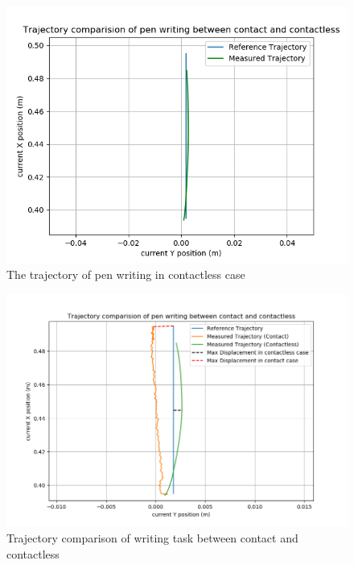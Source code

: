 \documentclass[report.tex]{subfiles}
\begin{document}
    \begin{figure}[H]
        \captionsetup[figure]{justification=centering}
                \centering
                \includegraphics[width=0.8\linewidth]{images/us2_contactless_traj.png}
                \caption{The trajectory of pen writing in contactless case}
                \label{fig:us2_nocon_plot}
    \end{figure}
    \begin{figure}[H]
        \centering
        \includegraphics[width=\linewidth]{images/us2_contactless_traj2.png}
        \caption{Trajectory comparison of writing task between contact and contactless}
        \label{fig:us2_traj_com_plot}
\end{figure}
\end{document}
